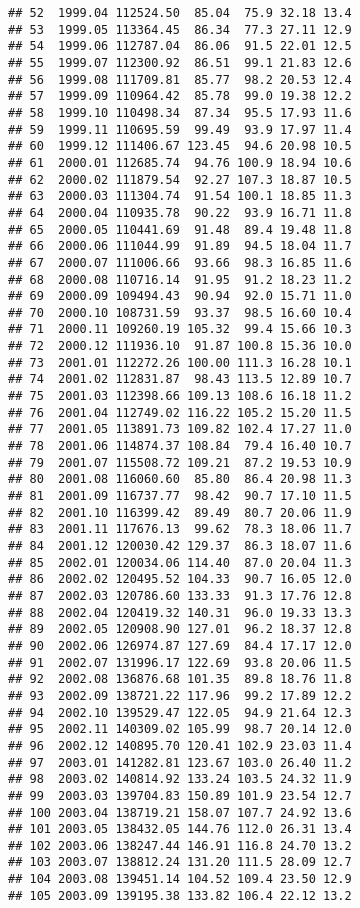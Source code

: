 \documentclass[]{article}
\begin{document}
\begin{verbatim}
## 52  1999.04 112524.50  85.04  75.9 32.18 13.4
## 53  1999.05 113364.45  86.34  77.3 27.11 12.9
## 54  1999.06 112787.04  86.06  91.5 22.01 12.5
## 55  1999.07 112300.92  86.51  99.1 21.83 12.6
## 56  1999.08 111709.81  85.77  98.2 20.53 12.4
## 57  1999.09 110964.42  85.78  99.0 19.38 12.2
## 58  1999.10 110498.34  87.34  95.5 17.93 11.6
## 59  1999.11 110695.59  99.49  93.9 17.97 11.4
## 60  1999.12 111406.67 123.45  94.6 20.98 10.5
## 61  2000.01 112685.74  94.76 100.9 18.94 10.6
## 62  2000.02 111879.54  92.27 107.3 18.87 10.5
## 63  2000.03 111304.74  91.54 100.1 18.85 11.3
## 64  2000.04 110935.78  90.22  93.9 16.71 11.8
## 65  2000.05 110441.69  91.48  89.4 19.48 11.8
## 66  2000.06 111044.99  91.89  94.5 18.04 11.7
## 67  2000.07 111006.66  93.66  98.3 16.85 11.6
## 68  2000.08 110716.14  91.95  91.2 18.23 11.2
## 69  2000.09 109494.43  90.94  92.0 15.71 11.0
## 70  2000.10 108731.59  93.37  98.5 16.60 10.4
## 71  2000.11 109260.19 105.32  99.4 15.66 10.3
## 72  2000.12 111936.10  91.87 100.8 15.36 10.0
## 73  2001.01 112272.26 100.00 111.3 16.28 10.1
## 74  2001.02 112831.87  98.43 113.5 12.89 10.7
## 75  2001.03 112398.66 109.13 108.6 16.18 11.2
## 76  2001.04 112749.02 116.22 105.2 15.20 11.5
## 77  2001.05 113891.73 109.82 102.4 17.27 11.0
## 78  2001.06 114874.37 108.84  79.4 16.40 10.7
## 79  2001.07 115508.72 109.21  87.2 19.53 10.9
## 80  2001.08 116060.60  85.80  86.4 20.98 11.3
## 81  2001.09 116737.77  98.42  90.7 17.10 11.5
## 82  2001.10 116399.42  89.49  80.7 20.06 11.9
## 83  2001.11 117676.13  99.62  78.3 18.06 11.7
## 84  2001.12 120030.42 129.37  86.3 18.07 11.6
## 85  2002.01 120034.06 114.40  87.0 20.04 11.3
## 86  2002.02 120495.52 104.33  90.7 16.05 12.0
## 87  2002.03 120786.60 133.33  91.3 17.76 12.8
## 88  2002.04 120419.32 140.31  96.0 19.33 13.3
## 89  2002.05 120908.90 127.01  96.2 18.37 12.8
## 90  2002.06 126974.87 127.69  84.4 17.17 12.0
## 91  2002.07 131996.17 122.69  93.8 20.06 11.5
## 92  2002.08 136876.68 101.35  89.8 18.76 11.8
## 93  2002.09 138721.22 117.96  99.2 17.89 12.2
## 94  2002.10 139529.47 122.05  94.9 21.64 12.3
## 95  2002.11 140309.02 105.99  98.7 20.14 12.0
## 96  2002.12 140895.70 120.41 102.9 23.03 11.4
## 97  2003.01 141282.81 123.67 103.0 26.40 11.2
## 98  2003.02 140814.92 133.24 103.5 24.32 11.9
## 99  2003.03 139704.83 150.89 101.9 23.54 12.7
## 100 2003.04 138719.21 158.07 107.7 24.92 13.6
## 101 2003.05 138432.05 144.76 112.0 26.31 13.4
## 102 2003.06 138247.44 146.91 116.8 24.70 13.2
## 103 2003.07 138812.24 131.20 111.5 28.09 12.7
## 104 2003.08 139451.14 104.52 109.4 23.50 12.9
## 105 2003.09 139195.38 133.82 106.4 22.12 13.2

\end{verbatim}
\end{document}
